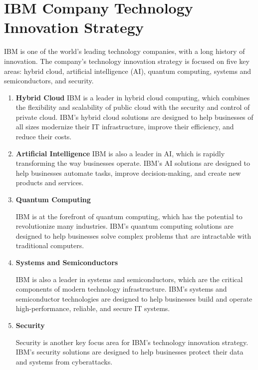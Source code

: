 \section{IBM Company Technology Innovation Strategy}

IBM is one of the world's leading technology companies, with a long history of innovation. The company's technology innovation strategy is focused on five key areas: hybrid cloud, artificial intelligence (AI), quantum computing, systems and semiconductors, and security.
\begin{enumerate}


    \item \textbf{Hybrid Cloud} IBM is a leader in hybrid cloud computing, which combines the flexibility and scalability of public cloud with the security and control of private cloud. IBM's hybrid cloud solutions are designed to help businesses of all sizes modernize their IT infrastructure, improve their efficiency, and reduce their costs.

    \item \textbf{Artificial Intelligence} IBM is also a leader in AI, which is rapidly transforming the way businesses operate. IBM's AI solutions are designed to help businesses automate tasks, improve decision-making, and create new products and services.

    \item \textbf{Quantum Computing}

IBM is at the forefront of quantum computing, which has the potential to revolutionize many industries. IBM's quantum computing solutions are designed to help businesses solve complex problems that are intractable with traditional computers.

    \item \textbf{Systems and Semiconductors}

IBM is also a leader in systems and semiconductors, which are the critical components of modern technology infrastructure. IBM's systems and semiconductor technologies are designed to help businesses build and operate high-performance, reliable, and secure IT systems.

    \item \textbf{Security}

Security is another key focus area for IBM's technology innovation strategy. IBM's security solutions are designed to help businesses protect their data and systems from cyberattacks.
\end{enumerate}

